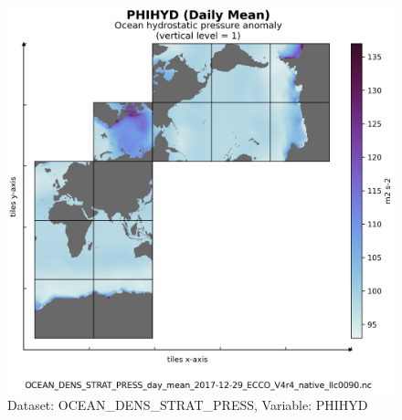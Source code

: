 \begin{figure}[H]
\centering
\includegraphics[scale=0.55]{../images/plots/v4r4/native_plots/Ocean_Density_Stratification_and_Hydrostatic_Pressure/PHIHYD.png}
\caption{Dataset: OCEAN\_DENS\_STRAT\_PRESS, Variable: PHIHYD}
\label{tab:table-OCEAN_DENS_STRAT_PRESS_PHIHYD-Plot}
\end{figure}
\newpage
\pagebreak
